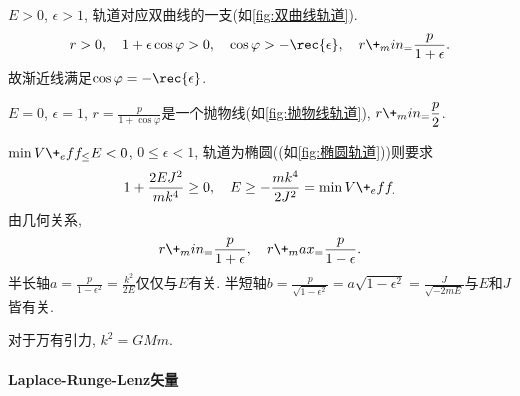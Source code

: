 \documentclass{ctexart}
\begin{document}
\begin{cenum}
    \item $E>0$, $\epsilon>1$, 轨道对应双曲线的一支(如\cref{fig:双曲线轨道}).
    \[ r>0,\quad 1+\epsilon\cos\varphi > 0,\quad \cos\varphi > -\rec{\epsilon},\quad r\+_min_ = \frac{p}{1+\epsilon}. \]
    故渐近线满足$\displaystyle \cos\varphi = -\rec{\epsilon}$.
    \item $E=0$, $\epsilon = 1$, $\displaystyle r = \frac{p}{1+\cos\varphi}$是一个抛物线(如\cref{fig:抛物线轨道}), $\displaystyle r\+_min_ = \frac{p}{2}$.
    \item $\min V\+_eff_ \le E<0$, $0\le \epsilon <1$, 轨道为椭圆((如\cref{fig:椭圆轨道}))则要求
    \[ 1+\frac{2EJ^2}{mk^4} \ge 0,\quad E\ge -\frac{mk^4}{2J^2} = \min V\+_eff_. \]
    由几何关系,
    \[ r\+_min_ = \frac{p}{1+\epsilon},\quad r\+_max_ = \frac{p}{1-\epsilon}. \]
    半长轴$a = \displaystyle \frac{p}{1-\epsilon^2} = \frac{k^2}{2E}$仅仅与$E$有关. 半短轴$\displaystyle b = \frac{p}{\sqrt{1-\epsilon^2}} = a\sqrt{1-\epsilon^2} = \frac{J}{\sqrt{-2mE}}$与$E$和$J$皆有关.
\end{cenum}
对于万有引力, $k^2 = GMm$.

\paragraph{Laplace-Runge-Lenz矢量} %
\label{par:laplace_runge_lenz矢量}
\end{document}

